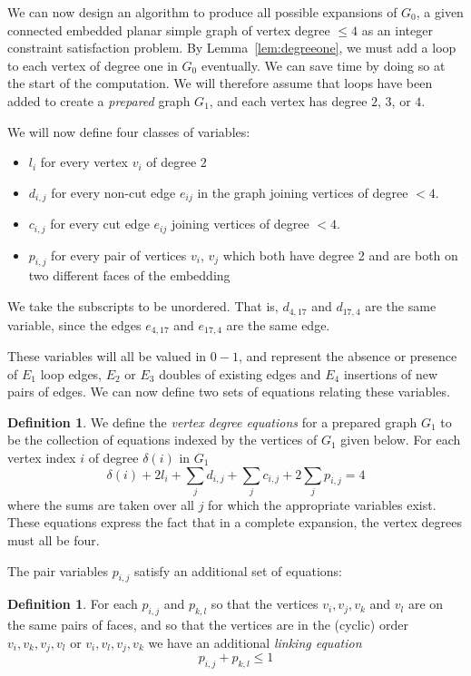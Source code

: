 \documentclass[amsmath,secnumarabic,floatfix,amssymb,nofootinbib,nobibnotes,letterpaper,11pt,tightenlines,showkeys]{revtex4}
\theoremstyle{definition}
\newtheorem{definition}[theorem]{Definition}
\newcommand{\loopinsert}{E_1}
\newcommand{\edgedouble}{E_2}
\newcommand{\cutedgedouble}{E_3}
\newcommand{\pairinsert}{E_4}
\begin{document}
We can now design an algorithm to produce all possible expansions of $G_0$, a given connected embedded planar simple graph of vertex degree $\leq 4$ as an integer constraint satisfaction problem. By Lemma~\ref{lem:degreeone}, we must add a loop to each vertex of degree one in $G_0$ eventually. We can save time by doing so at the start of the computation. We will therefore assume that loops have been added to create a \emph{prepared} graph $G_1$, and each vertex has degree $2$, $3$, or $4$.

We will now define four classes of variables:
\begin{itemize}
\item $l_{i}$ for every vertex $v_i$ of degree $2$
\item $d_{i,j}$ for every non-cut edge $e_{ij}$ in the graph joining vertices of degree $<4$.
\item $c_{i,j}$ for every cut edge $e_{ij}$ joining vertices of degree $<4$.
\item $p_{i,j}$ for every pair of vertices $v_{i}$, $v_j$ which both have degree 2 and are both on two different faces of the embedding
\end{itemize}
We take the subscripts to be unordered. That is, $d_{4,17}$ and $d_{17,4}$ are the same variable, since the edges $e_{4,17}$ and $e_{17,4}$ are the same edge.

These variables will all be valued in $0-1$, and represent the absence or presence of $\loopinsert$ loop edges, $\edgedouble$ or $\cutedgedouble$ doubles of existing edges and $\pairinsert$ insertions of new pairs of edges.
We can now define two sets of equations relating these variables.

\begin{definition}
We define the \emph{vertex degree equations} for a prepared graph $G_1$ to be the collection of equations indexed by the vertices of $G_1$ given below. For each vertex index $i$ of degree $\delta(i)$ in $G_1$
\begin{equation*}
\delta(i) + 2 l_i + \sum_j d_{i,j} + \sum_j c_{i,j} + 2 \sum_j p_{i,j} = 4
\end{equation*}
where the sums are taken over all $j$ for which the appropriate variables exist. These equations express the fact that in a complete expansion, the vertex degrees must all be four.
\end{definition}

The pair variables $p_{i,j}$ satisfy an additional set of equations:
\begin{definition}
For each $p_{i,j}$ and $p_{k,l}$ so that the vertices $v_i, v_j, v_k$ and $v_l$ are on the same pairs of faces, and so that the vertices are in the (cyclic) order $v_i, v_k, v_j, v_l$ or $v_i, v_l, v_j, v_k$ we have an additional \emph{linking equation}
\begin{equation*}
p_{i,j} + p_{k,l} \leq 1
\end{equation*}
\end{definition}
\end{document}
